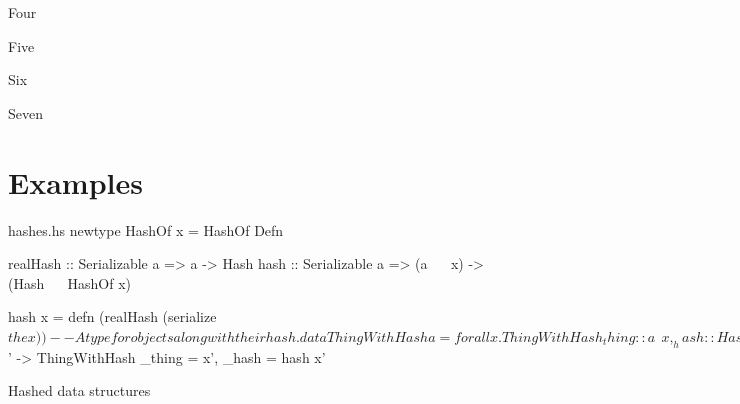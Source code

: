 \documentclass{beamer}
\begin{document}

\begin{frame}{Four}

\end{frame}

\begin{frame}{Five}

\end{frame}

\begin{frame}{Six}

\end{frame}


\begin{frame}{Seven}

\end{frame}

  \section{Examples}   %

\begin{filecontents*}{hashes.hs}
newtype HashOf x = HashOf Defn

realHash :: Serializable a =>  a       ->  Hash
hash     :: Serializable a => (a ~~ x) -> (Hash ~~ HashOf x)

hash x = defn (realHash (serialize $ the x))

-- A type for objects along with their hash.
data ThingWithHash a = forall x. ThingWithHash
  { _thing :: a    ~~ x
  , _hash  :: Hash ~~ HashOf x }

-- Use it like this:
hashIt :: Serializable a => a -> ThingWithHash a
hashIt x = name x $ \x' ->
  ThingWithHash { _thing = x', _hash = hash x' }
                          
    
\end{filecontents*}

\begin{frame}{Hashed data structures}
\inputminted{haskell}{hashes.hs}
\end{frame}
\end{document}

